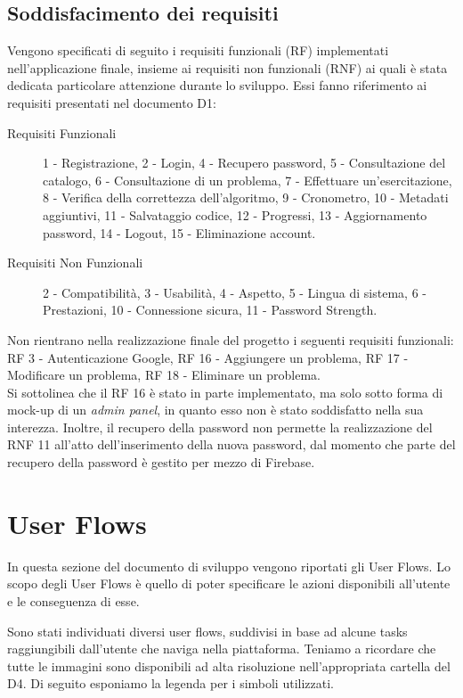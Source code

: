 \documentclass[11pt, a4paper]{article}
\theoremstyle{definition}
\begin{document}
\subsection{Soddisfacimento dei requisiti}
Vengono specificati di seguito i requisiti funzionali (RF)
implementati nell'applicazione finale, insieme ai requisiti non funzionali
(RNF) ai quali è stata dedicata particolare attenzione durante
lo sviluppo. Essi fanno riferimento
ai requisiti presentati nel documento D1:
\begin{description}
  \item[Requisiti Funzionali] 1 - Registrazione, 2 - Login, 4 - Recupero password, 5 - Consultazione del catalogo, 6 - Consultazione di un problema, 7 - Effettuare un'esercitazione, 8 - Verifica della correttezza dell'algoritmo, 9 - Cronometro, 10 - Metadati aggiuntivi, 11 - Salvataggio codice, 12 - Progressi, 13 - Aggiornamento password, 14 - Logout, 15 - Eliminazione account.
  \item[Requisiti Non Funzionali] 2 - Compatibilità, 3 - Usabilità, 4 - Aspetto, 5 - Lingua di sistema, 6 - Prestazioni, 10 - Connessione sicura, 11 - Password Strength.
\end{description}
Non rientrano nella realizzazione finale del progetto i seguenti requisiti funzionali:
RF 3 - Autenticazione Google, RF 16 - Aggiungere un problema, RF 17 - Modificare un problema, RF 18 - Eliminare un problema.
\\
Si sottolinea che il RF 16 è stato in parte implementato, ma solo sotto forma di mock-up di un \textit{admin panel}, in quanto esso non è stato soddisfatto nella sua interezza.
Inoltre, il recupero della password non permette la realizzazione del RNF 11 all'atto dell'inserimento della nuova password, dal momento che
parte del recupero della password è gestito per mezzo di Firebase.



\newpage
\section{User Flows}
In questa sezione del documento di sviluppo vengono riportati gli
User Flows. Lo scopo degli User Flows
è quello di poter specificare le azioni disponibili all'utente e
le conseguenza di esse.

Sono stati individuati diversi user flows, suddivisi in base ad
alcune tasks raggiungibili dall'utente che naviga nella piattaforma.
Teniamo a ricordare che tutte le immagini sono disponibili ad
alta risoluzione nell'appropriata cartella del D4.
Di seguito esponiamo la legenda per i simboli utilizzati.
\end{document}
